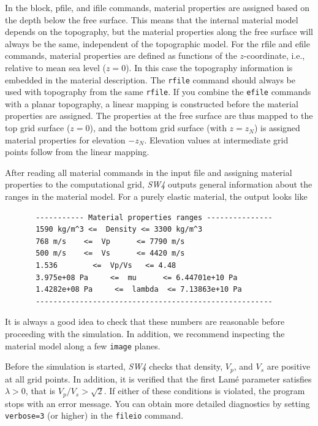 \documentclass[11pt]{report}
\begin{document}
In the block, pfile, and ifile commands, material properties are assigned based on the depth below
the free surface. This means that the internal material model depends on the topography, but the
material properties along the free surface will always be the same, independent of the topographic
model. For the rfile and efile commands, material properties are defined as functions of the
$z$-coordinate, i.e., relative to mean sea level ($z=0$). In this case the topography information is
embedded in the material description. The {\tt rfile} command should always be used with topography
from the same {\tt rfile}. If you combine the {\tt efile} commands with a planar topography, a
linear mapping is constructed before the material properties are assigned. The properties at the
free surface are thus mapped to the top grid surface ($z=0$), and the bottom grid surface (with
$z=z_N$) is assigned material properties for elevation $-z_N$. Elevation values at intermediate grid
points follow from the linear mapping.

After reading all material commands in the input file and assigning material properties to the
computational grid, \emph{SW4} outputs general information about the ranges in the material
model. For a purely elastic material, the output looks like
\begin{verbatim}
       ----------- Material properties ranges ---------------
       1590 kg/m^3 <=  Density <= 3300 kg/m^3
       768 m/s    <=  Vp      <= 7790 m/s
       500 m/s    <=  Vs      <= 4420 m/s
       1.536        <=  Vp/Vs   <= 4.48
       3.975e+08 Pa     <=  mu      <= 6.44701e+10 Pa
       1.4282e+08 Pa     <=  lambda  <= 7.13863e+10 Pa
       ------------------------------------------------------
\end{verbatim}
It is always a good idea to check that these numbers are reasonable before proceeding with the
simulation. In addition, we recommend inspecting the material model along a few \verb+image+ planes.

Before the simulation is started, \emph{SW4} checks that density, $V_p$, and $V_s$ are
positive at all grid points. In addition, it is verified that the first Lam\'e parameter satisfies
$\lambda>0$, that is $V_p/V_s > \sqrt{2}$. If either of these conditions is violated, the program
stops with an error message. You can obtain more detailed diagnostics by setting \verb+verbose=3+
(or higher) in the \verb+fileio+ command.
\end{document}
